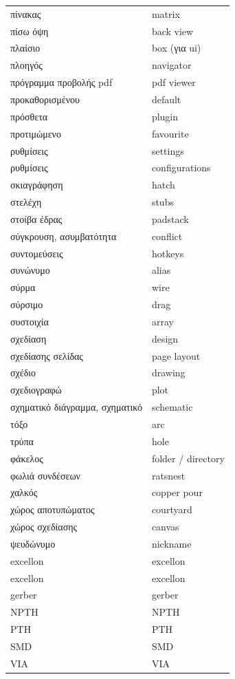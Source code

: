 \documentclass[a4paper]{article}
\begin{document}
\begin{longtabu}{ l l }
    πίνακας	&	matrix	\\
    πίσω όψη	&	back view	\\
    πλαίσιο	&	box (για ui)	\\
    πλοηγός	&	navigator	\\
    πρόγραμμα προβολής pdf	&	pdf viewer	\\
    προκαθορισμένου	&	default	\\
    πρόσθετα	&	plugin	\\
    προτιμώμενο	&	favourite	\\
    ρυθμίσεις	&	settings	\\
    ρυθμίσεις	&	configurations	\\
    σκιαγράφηση	&	hatch	\\
    στελέχη	&	stubs	\\
    στοίβα έδρας	&	padstack	\\
    σύγκρουση, ασυμβατότητα	&	conflict	\\
    συντομεύσεις	&	hotkeys	\\
    συνώνυμο	&	alias	\\
    σύρμα	&	wire	\\
    σύρσιμο	&	drag	\\
    συστοιχία	&	array	\\
    σχεδίαση	&	design	\\
    σχεδίασης σελίδας	&	page layout	\\
    σχέδιο	&	drawing	\\
    σχεδιογραφώ	&	plot	\\
    σχηματικό διάγραμμα, σχηματικό	&	schematic	\\
    τόξο	&	arc	\\
    τρύπα	&	hole	\\
    φάκελος	&	folder / directory	\\
    φωλιά συνδέσεων	&	ratsnest	\\
    χαλκός	&	copper pour	\\
    χώρος αποτυπώματος	&	courtyard	\\
    χώρος σχεδίασης	&	canvas	\\
    ψευδώνυμο	&	nickname	\\
    excellon	&	excellon	\\
    excellon	&	excellon	\\
    gerber	&	gerber	\\
    NPTH	&	NPTH	\\
    PTH	&	PTH	\\
    SMD	&	SMD	\\
    VIA	&	VIA	\\
\end{longtabu}
\end{document}
